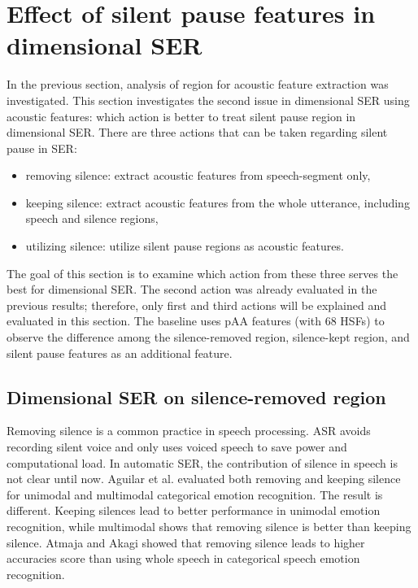 \section{Effect of silent pause features in dimensional SER}
In the previous section, analysis of region for acoustic feature extraction was
investigated. This section investigates the second issue in dimensional SER
using acoustic features: which action is better to treat silent pause region in
dimensional SER. There are three actions that can be taken regarding silent
pause in SER:
\begin{itemize}
\item removing silence: extract acoustic features from speech-segment only,
\item keeping silence: extract acoustic features from the whole utterance,
including speech and silence regions,
\item utilizing silence: utilize silent pause regions as acoustic features.
\end{itemize}
The goal of this section is to examine which action from these three serves the
best for dimensional SER. The second action was already evaluated in the
previous results; therefore, only first and third actions will be explained and
evaluated in this section. The baseline uses pAA features (with 68 HSFs) to
observe the difference among the silence-removed region, silence-kept region,
and silent pause features as an additional feature.


\subsection{Dimensional SER on silence-removed region}
Removing silence is a common practice in speech processing. ASR avoids
recording silent voice and only uses voiced speech to save power and
computational load. In automatic SER, the contribution of silence in speech is
not clear until now. Aguilar et al. \cite{Aguilar2020} evaluated both removing
and keeping silence for unimodal and multimodal categorical emotion
recognition. The result is different.  Keeping silences lead to better
performance in unimodal emotion recognition, while multimodal shows that
removing silence is better than keeping silence. Atmaja and Akagi
\cite{Atmaja2019} showed that removing silence leads to higher accuracies score
than using whole speech in categorical speech emotion recognition. 

